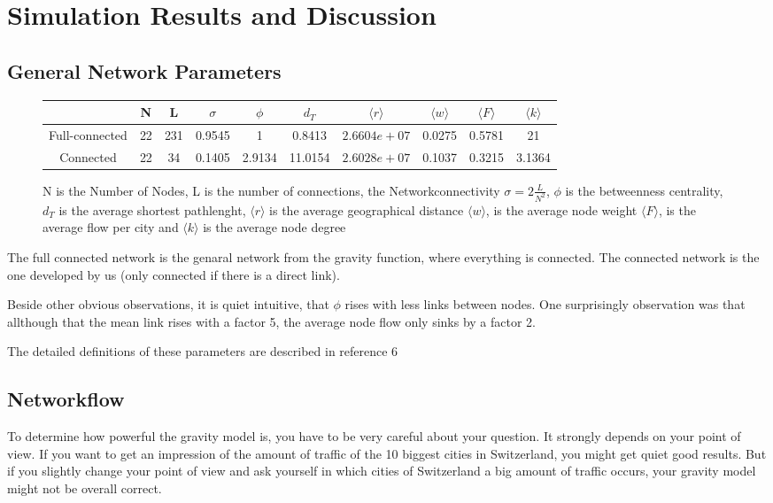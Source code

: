 \documentclass[11pt]{article}
\begin{document}
\section{Simulation Results and Discussion}

\subsection{General Network Parameters}
\begin{figure}[h]
\begin{tabular}{c|c|c|c|c|c|c|c|c|c|}
 & N & L & $\sigma$ & $\phi$ & $d_T$ & $\langle r\rangle$ & 
 $\langle w\rangle$ & $\langle F\rangle$&$\langle k\rangle$ \\\hline
 Full-connected & 22 & 231 &0.9545&1& 0.8413& $2.6604e+07$&0.0275&0.5781& 21\\\hline
 
 Connected & 22 & 34 &    0.1405&2.9134& 11.0154&$2.6028e+07$&0.1037&0.3215& 3.1364\\\hline
\end{tabular}
\caption{N is the Number of Nodes, L is the number of connections, the Networkconnectivity $\sigma=2\frac{L}{N^2}$, $\phi$ is the betweenness centrality, $d_T$ is the average shortest pathlenght,  $\langle r\rangle$ is the average geographical distance  
 $\langle w\rangle$, is the average node weight $\langle F\rangle$, is the average flow per city and $\langle k\rangle$ is the average node degree}
\end{figure}

The full connected network is the genaral network from the gravity function, where everything is connected. The connected network is the one developed by us (only connected if there is a direct link).

Beside other obvious observations, it is quiet intuitive, that $\phi$ rises with less links between nodes. One surprisingly observation was that allthough that the mean link rises with a factor 5, the average node flow only sinks by a factor 2.\newline

The detailed definitions of these parameters are described in reference 6 


\subsection{Networkflow}

To determine how powerful the gravity model is, you have to be very careful about your question. It strongly depends on your point of view. If you want to get an impression of the amount of traffic of the 10 biggest cities in Switzerland, you might get quiet good results. But if you slightly change your point of view and ask yourself in which cities of Switzerland a big amount of traffic occurs, your gravity model might not be overall correct. 
\end{document}
